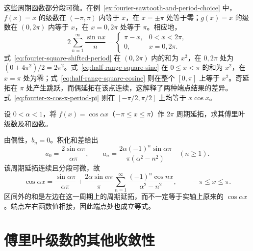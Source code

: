 \documentclass[UTF8,12pt,a4paper,fontset=fandol]{ctexbook}
\begin{document}
\begin{solve}
这些周期函数都分段可微。在例~\ref{ex:fourier-sawtooth-and-period-choice} 中，$f(x)=x$ 的级数在 $(-\pi,\pi)$ 内等于 $x$，在 $x=\pm\pi$ 处等于零；$g(x)=x$ 的级数在 $(0,2\pi)$ 内等于 $x$，在 $x=0,2\pi$ 处等于 $\pi$。相应地，
\begin{equation}
    2\sum_{n=1}^\infty\frac{\sin nx}{n}
      =\begin{cases}\pi-x,&0<x<2\pi,\\0,&x=0,2\pi.\end{cases}
    \label{eq:fourier-pi-minus-x-sum}
\end{equation}
式~\eqref{eq:fourier-square-shifted-period} 在 $(0,2\pi)$ 内的和为 $x^2$，在 $0,2\pi$ 处为 $(0+4\pi^2)/2=2\pi^2$。式~\eqref{eq:half-range-square-sine} 在 $0\leq x<\pi$ 的和为 $x^2$，在 $x=\pi$ 处为零；式~\eqref{eq:half-range-square-cosine} 则在整个 $[0,\pi]$ 上等于 $x^2$。奇延拓在 $\pi$ 处产生跳跃，而偶延拓在该点连续，这解释了两种端点结果的差异。式~\eqref{eq:fourier-x-cos-x-period-pi} 则在 $[-\pi/2,\pi/2]$ 上均等于 $x\cos x$。
\end{solve}

\begin{example}
\label{ex:fourier-cos-noninteger-frequency}
设 $0<\alpha<1$，将 $f(x)=\cos\alpha x$（$-\pi\leq x\leq\pi$）作 $2\pi$ 周期延拓，求其傅里叶级数及和函数。
\end{example}

\begin{solve}
由偶性，$b_n=0$。积化和差给出
\[
    a_0=\frac{2\sin\alpha\pi}{\alpha\pi},\qquad
    a_n=\frac{2\alpha(-1)^n\sin\alpha\pi}
                       {\pi(\alpha^2-n^2)}\quad(n\geq1).
\]
该周期延拓连续且分段可微，故
\begin{equation}
    \cos\alpha x=\frac{\sin\alpha\pi}{\alpha\pi}
       +\frac{2\alpha\sin\alpha\pi}{\pi}
          \sum_{n=1}^\infty
                    \frac{(-1)^n\cos nx}{\alpha^2-n^2},
    \qquad -\pi\leq x\leq\pi.
    \label{eq:fourier-cos-noninteger-frequency}
\end{equation}
区间外的和是左边在这一周期上的周期延拓，而不一定等于实轴上原来的 $\cos\alpha x$。端点左右函数值相接，因此端点处也成立等式。
\end{solve}

\section{傅里叶级数的其他收敛性}
\label{sec:other-convergence-properties-of-fourier-series}
\end{document}
